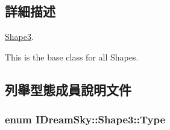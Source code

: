 \subsection{詳細描述}
\hyperlink{class_i_dream_sky_1_1_shape3}{Shape3}. 

This is the base class for all Shapes. 

\subsection{列舉型態成員說明文件}
\subsubsection[{\texorpdfstring{Type}{Type}}]{\setlength{\rightskip}{0pt plus 5cm}enum {\bf I\+Dream\+Sky\+::\+Shape3\+::\+Type}}\hypertarget{class_i_dream_sky_1_1_shape3_afabf580a0794194e29eb14495ead7ae9}{}\label{class_i_dream_sky_1_1_shape3_afabf580a0794194e29eb14495ead7ae9}
